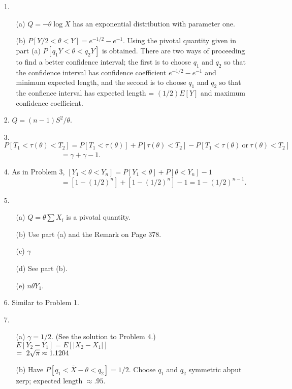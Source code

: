 \begin{enumerate}
	\item[1.] \begin{enumerate}
		\item[(a)] $Q=-\theta\log X$ has an exponential distribution with parameter one.
		\item[(b)] $P[Y/2 <\theta <Y] = e^{-1/2}-e^{-1}$. Using the pivotal quantity given in part (a) $P[q_1Y < \theta < q_2Y]$ is obtained.  There are two ways of proceeding to find a better confidence interval; the first is to choose $q_1$ and $q_2$ so that the confidence interval has confidence coefficient $e^{-1/2}-e^{-1}$ and minimum expected length, and the second is to choose $q_1$ and $q_2$ so that the confience interval has expected length = $(1/2)E[Y]$ and maximum confidence coefficient.
	\end{enumerate}
	
	\item[2.] $Q=(n-1)S^2/\theta$.
	
	\item[3.] $P[T_1 < \tau(\theta) < T_2] = P[T_1 < \tau(\theta)] + P[\tau(\theta) < T_2] - P[T_1<\tau(\theta)\ \mbox{or}\ \tau(\theta) < T_2]$ \\
	${}\qquad\qquad\qquad\qquad = \gamma + \gamma -1$.
	
	\item[4.] As in Problem 3, $[Y_1 < \theta < Y_n] = P[Y_1 < \theta] + P[\theta < Y_n] - 1$\\
	${}\qquad\qquad\qquad\qquad = [1-(1/2)^n] + [1-(1/2)^n] -1 = 1 - (1/2)^{n-1}$.
	
	\item[5.] \begin{enumerate}
		\item[(a)] $Q= \theta\sum X_i$ is a pivotal quantity.
		\item[(b)] Use part (a) and the Remark on Page 378.
		\item[(c)] $\gamma$
		\item[(d)] See part (b).
		\item[(e)] $n\theta Y_1$.
	\end{enumerate}
	
	\item[6.] Similar to Problem 1.
	
	\item[7.] \begin{enumerate}
		\item[(a)] $\gamma=1/2$. (See the solution to Problem 4.) $E[Y_2-Y_1]=E[\vert X_2-X_1\vert]$ \\
		$=\ 2\/\sqrt{\pi} \approx 1.1204$
		\item[(b)] Have $P[q_1 < \overline{X}-\theta < q_2] = 1/2$. Choose $q_1$ and $q_2$ symmetric abput zerp; expected length $\approx .95$.
	\end{enumerate}
	

\end{enumerate}
